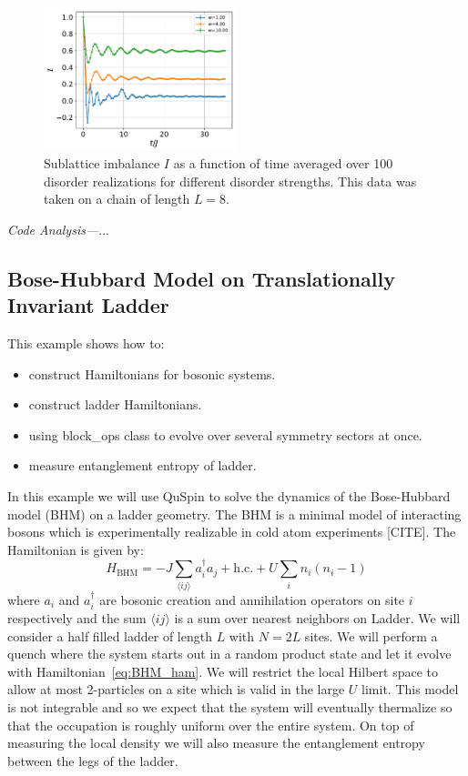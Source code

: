 \documentclass{SciPost}
\newcommand\0{\scalebox{-1}[1]{0}}
\newcommand{\MBLcode}{example9.py}
\begin{document}
\begin{figure}[t!]
	\centering
	\includegraphics[width=0.5\textwidth]{fermion_MBL.pdf}
	\caption{Sublattice imbalance $I$ as a function of time averaged over 100 disorder realizations for different disorder strengths. This data was taken on a chain of length $L=8$.}
\end{figure}

\noindent\emph{Code Analysis---}...








\subsection{Bose-Hubbard Model on Translationally Invariant Ladder}
\label{subsec:Bose_Ladder}

This example shows how to:
\begin{itemize}
	\item construct Hamiltonians for bosonic systems.
	\item construct ladder Hamiltonians.
	\item using block\_ops class to evolve over several symmetry sectors at once.
	\item measure entanglement entropy of ladder.
\end{itemize}

In this example we will use QuSpin to solve the dynamics of the Bose-Hubbard model (BHM) on a ladder geometry. The BHM is a minimal model of interacting bosons which is experimentally realizable in cold atom experiments [CITE]. The Hamiltonian is given by:
\begin{equation}
	H_\mathrm{BHM} = -J\sum_{\langle ij\rangle} a_i^\dagger a_j + \mathrm{h.c.} + U\sum_{i}n_i(n_i-1)\label{eq:BHM_ham}
\end{equation} 
where $a_i$ and $a^\dagger_i$ are bosonic creation and annihilation operators on site $i$ respectively and the sum $\langle ij\rangle$ is a sum over nearest neighbors on Ladder. We will consider a half filled ladder of length $L$ with $N=2L$ sites. We will perform a quench where the system starts out in a random product state and let it evolve with Hamiltonian~\eqref{eq:BHM_ham}. We will restrict the local Hilbert space to allow at most 2-particles on a site which is valid in the large $U$ limit. This model is not integrable and so we expect that the system will eventually thermalize so that the occupation is roughly uniform over the entire system. On top of measuring the local density we will also measure the entanglement entropy between the legs of the ladder.
\end{document}
